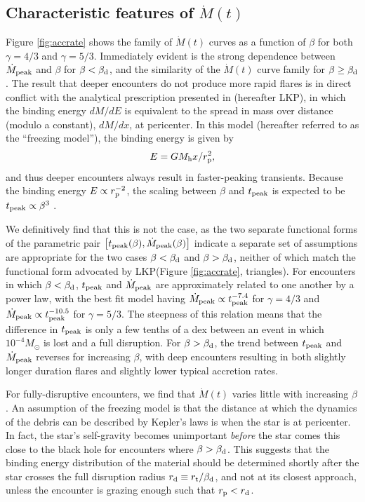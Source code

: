 \documentclass[twocolumn]{emulateapj}
\newcommand{\md}{\dot{M}\left(t\right)}
\newcommand{\mdpeak}{\dot{M}_{\rm peak}}
\newcommand{\tpeak}{t_{\rm peak}}
\newcommand{\mh}{M_{\rm h}}
\newcommand{\msun}{M_{\odot}}
\newcommand{\lodato}{LKP\xspace}
\begin{document}
\subsection{Characteristic features of $\md$}\label{sec:characteristic}

Figure \ref{fig:accrate} shows the family of $\md$ curves as a function of $\beta$ for both $\gamma = 4/3$ and $\gamma = 5/3$. Immediately evident is the strong dependence between $\mdpeak$ and $\beta$ for $\beta < \beta_{\rm d}$, and the similarity of the $\md$ curve family for $\beta \geq \beta_{\rm d}$. The result that deeper encounters do not produce more rapid flares is in direct conflict with the analytical prescription presented in \cite{Lodato:2009iba} (hereafter \lodato), in which the binding energy $dM/dE$ is equivalent to the spread in mass over distance (modulo a constant), $dM/dx$, at pericenter. In this model (hereafter referred to as the ``freezing model''), the binding energy is given by 
\begin{equation}
E = G \mh x / r_{\rm p}^{2},\label{eq:binen}
\end{equation}
and thus deeper encounters always result in faster-peaking transients. Because the binding energy $E \propto r_{\rm p}^{-2}$, the scaling between $\beta$ and $\tpeak$ is expected to be $\tpeak \propto \beta^{3}$ \citep{Ulmer:1999jja}.

We definitively find that this is not the case, as the two separate functional forms of the parametric pair $\left[\tpeak(\beta),\mdpeak(\beta)\right]$ indicate a separate set of assumptions are appropriate for the two cases $\beta < \beta_{\rm d}$ and $\beta > \beta_{\rm d}$, neither of which match the functional form advocated by \lodato (Figure \ref{fig:accrate}, triangles). For encounters in which $\beta < \beta_{\rm d}$, $\tpeak$ and $\mdpeak$ are approximately related to one another by a power law, with the best fit model having $\mdpeak \propto \tpeak^{-7.4}$ for $\gamma = 4/3$ and $\mdpeak \propto \tpeak^{-10.5}$ for $\gamma = 5/3$. The steepness of this relation means that the difference in $\tpeak$ is only a few tenths of a dex between an event in which $10^{-4} \msun$ is lost and a full disruption. For $\beta > \beta_{\rm d}$, the trend between $\tpeak$ and $\mdpeak$ reverses for increasing $\beta$, with deep encounters resulting in both slightly longer duration flares and slightly lower typical accretion rates.

For fully-disruptive encounters, we find that $\md$ varies little with increasing $\beta$. An assumption of the freezing model is that the distance at which the dynamics of the debris can be described by Kepler's laws is when the star is at pericenter. In fact, the star's self-gravity becomes unimportant {\it before} the star comes this close to the black hole for encounters where $\beta > \beta_{\rm d}$. This suggests that the binding energy distribution of the material should be determined shortly after the star crosses the full disruption radius $r_{\rm d} \equiv r_{\rm t} / \beta_{\rm d}$, and not at its closest approach, unless the encounter is grazing enough such that $r_{\rm p} < r_{\rm d}$.
\end{document}
